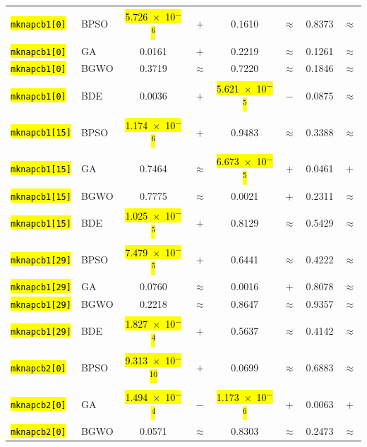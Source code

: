 \documentclass[mathematics,article,accept,moreauthors]{Definitions/mdpi}
\begin{document}
\begin{table}[H]
\begin{tabularx}{\textwidth}{Xlcccccc}
    \texttt{\hl{mknapcb1[0]}} & BPSO  & \hl{5.726~$\times$~10\textsuperscript{$-$6}} %
 & $+$ &    0.1610 & $\approx$ &    0.8373 & $\approx$ \\
    \texttt{\hl{mknapcb1[0]}} & GA    &    0.0161 & $+$ &    0.2219 & $\approx$ &    0.1261 & $\approx$ \\
    \texttt{\hl{mknapcb1[0]}} & BGWO  &    0.3719 & $\approx$ &    0.7220 & $\approx$ &    0.1846 & $\approx$ \\
    \texttt{\hl{mknapcb1[0]}} & BDE   &    0.0036 & $+$ & \hl{5.621~$\times$~10\textsuperscript{$-$5}} & $-$ &    0.0875 & $\approx$ \\
    \midrule
    \texttt{\hl{mknapcb1[15]}} & BPSO  & \hl{1.174~$\times$~10\textsuperscript{$-$6}} & $+$ &    0.9483 & $\approx$ &    0.3388 & $\approx$ \\
    \texttt{\hl{mknapcb1[15]}} & GA    &    0.7464 & $\approx$ & \hl{6.673~$\times$~10\textsuperscript{$-$5}} & $+$ &    0.0461 & $+$ \\
    \texttt{\hl{mknapcb1[15]}} & BGWO  &    0.7775 & $\approx$ &    0.0021 & $+$ &    0.2311 & $\approx$ \\
    \texttt{\hl{mknapcb1[15]}} & BDE   & \hl{1.025~$\times$~10\textsuperscript{$-$5}} & $+$ &    0.8129 & $\approx$ &    0.5429 & $\approx$ \\
    \midrule
    \texttt{\hl{mknapcb1[29]}} & BPSO  & \hl{7.479~$\times$~10\textsuperscript{$-$5}} & $+$ &    0.6441 & $\approx$ &    0.4222 & $\approx$ \\
    \texttt{\hl{mknapcb1[29]}} & GA    &    0.0760 & $\approx$ &    0.0016 & $+$ &    0.8078 & $\approx$ \\
    \texttt{\hl{mknapcb1[29]}} & BGWO  &    0.2218 & $\approx$ &    0.8647 & $\approx$ &    0.9357 & $\approx$ \\
    \texttt{\hl{mknapcb1[29]}} & BDE   & \hl{1.827~$\times$~10\textsuperscript{$-$4}} & $+$ &    0.5637 & $\approx$ &    0.4142 & $\approx$ \\
    \midrule
    \texttt{\hl{mknapcb2[0]}} & BPSO  & \hl{9.313~$\times$~10\textsuperscript{$-$10}} & $+$ &    0.0699 & $\approx$ &    0.6883 & $\approx$ \\
    \texttt{\hl{mknapcb2[0]}} & GA    & \hl{1.494~$\times$~10\textsuperscript{$-$4}} & $-$ & \hl{1.173~$\times$~10\textsuperscript{$-$6}} & $+$ &    0.0063 & $+$ \\
    \texttt{\hl{mknapcb2[0]}} & BGWO  &    0.0571 & $\approx$ &    0.8303 & $\approx$ &    0.2473 & $\approx$ \\

\end{tabularx}
\end{table}
\end{document}
